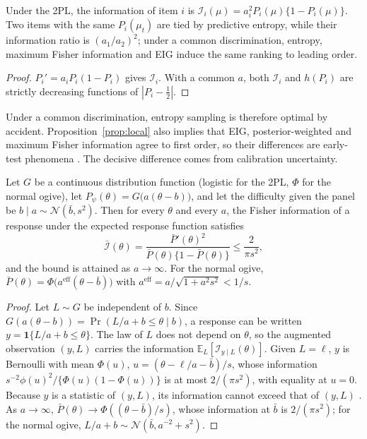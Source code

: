 \begin{corollary}\label{cor:blind}
Under the 2PL, the information of item $i$ is $\mathcal I_i(\mu)=a_i^2P_i(\mu)\{1-P_i(\mu)\}$.
Two items with the same $P_i(\mu_t)$ are tied by predictive entropy, while their information
ratio is $(a_1/a_2)^2$;
under a common discrimination, entropy, maximum Fisher information and EIG induce the same
ranking to leading order.
\end{corollary}

\begin{proof}
$P_i'=a_iP_i(1-P_i)$ gives $\mathcal I_i$. With a common $a$, both $\mathcal I_i$ and
$h(P_i)$ are strictly decreasing functions of $|P_i-\frac12|$.
\end{proof}

Under a common discrimination, entropy sampling is therefore optimal by accident.
Proposition~\ref{prop:local} also implies that EIG, posterior-weighted and maximum Fisher
information agree to first order, so their differences are early-test phenomena
\citep{chen2000comparison}. The decisive difference comes from calibration uncertainty.

\begin{proposition}\label{prop:cap}
Let $G$ be a continuous distribution function (logistic for the 2PL, $\Phi$ for the normal
ogive), let $P_\psi(\theta)=G\big(a(\theta-b)\big)$, and let the difficulty given the panel
be $b\mid a\sim\mathcal N(\bar b,s^2)$. Then for every $\theta$ and every $a$, the Fisher
information of a response under the expected response function satisfies
\begin{equation}\label{eq:cap}
\bar{\mathcal I}(\theta)=\frac{\bar P'(\theta)^2}{\bar P(\theta)\{1-\bar P(\theta)\}}\le\frac{2}{\pi s^2},
\end{equation}
and the bound is attained as $a\to\infty$. For the normal ogive,
$\bar P(\theta)=\Phi\big(a^{\mathrm{eff}}(\theta-\bar b)\big)$ with
$a^{\mathrm{eff}}=a/\sqrt{1+a^2s^2}<1/s$.
\end{proposition}

\begin{proof}
Let $L\sim G$ be independent of $b$. Since $G(a(\theta-b))=\Pr(L/a+b\le\theta\mid b)$, a
response can be written $y=\mathbf 1\{L/a+b\le\theta\}$. The law of $L$ does not depend on
$\theta$, so the augmented observation $(y,L)$ carries the information
$\mathbb E_L[\mathcal I_{y\mid L}(\theta)]$. Given $L=\ell$, $y$ is Bernoulli with mean
$\Phi(u)$, $u=(\theta-\ell/a-\bar b)/s$, whose information
$s^{-2}\phi(u)^2/\{\Phi(u)(1-\Phi(u))\}$ is at most $2/(\pi s^2)$, with equality at $u=0$.
Because $y$ is a statistic of $(y,L)$, its information cannot exceed that of $(y,L)$
\citep{zamir1998proof}. As $a\to\infty$, $\bar P(\theta)\to\Phi((\theta-\bar b)/s)$, whose
information at $\bar b$ is $2/(\pi s^2)$; for the normal ogive,
$L/a+b\sim\mathcal N(\bar b,a^{-2}+s^2)$.
\end{proof}

